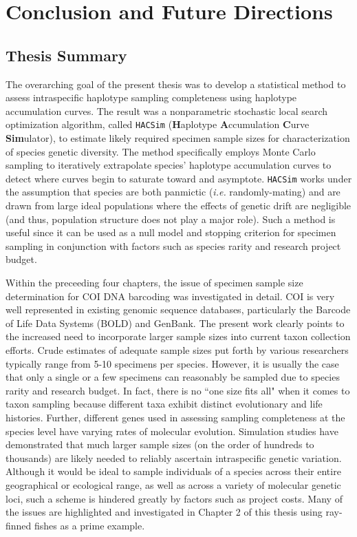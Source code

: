 \linespread{1.0}

\chapter{Conclusion and Future Directions}
\section{Thesis Summary} \label{sec:intro1}

The overarching goal of the present thesis was to develop a statistical method to assess intraspecific haplotype sampling completeness using haplotype accumulation curves. The result was a nonparametric stochastic local search optimization algorithm, called {\tt HACSim} (\textbf{H}aplotype \textbf{A}ccumulation \textbf{C}urve \textbf{Sim}ulator), to estimate likely required specimen sample sizes for characterization of species genetic diversity. The method specifically employs Monte Carlo sampling to iteratively extrapolate species' haplotype accumulation curves to detect where curves begin to saturate toward and asymptote. {\tt HACSim} works under the assumption that species are both panmictic (\textit{i.e.} randomly-mating) and are drawn from large ideal populations where the effects of genetic drift are negligible (and thus, population structure does not play a major role). Such a method is useful since it can be used as a null model and stopping criterion for specimen sampling in conjunction with factors such as species rarity and research project budget.

Within the preceeding four chapters, the issue of specimen sample size determination for COI DNA barcoding was investigated in detail. COI is very well represented in existing genomic sequence databases, particularly the Barcode of Life Data Systems (BOLD) and GenBank. The present work clearly points to the increased need to incorporate larger sample sizes into current taxon collection efforts. Crude estimates of adequate sample sizes put forth by various researchers typically range from 5-10 specimens per species. However, it is usually the case that only a single or a few specimens can reasonably be sampled due to species rarity and research budget. In fact, there is no ``one size fits all" when it comes to taxon sampling because different taxa exhibit distinct evolutionary and life histories. Further, different genes used in assessing sampling completeness at the species level have varying rates of molecular evolution. Simulation studies have demonstrated that much larger sample sizes (on the order of hundreds to thousands) are likely needed to reliably ascertain intraspecific genetic variation. Although it would be ideal to sample individuals of a species across their entire geographical or ecological range, as well as across a variety of molecular genetic loci, such a scheme is hindered greatly by factors such as project costs. Many of the issues are highlighted and investigated in Chapter 2 of this thesis using ray-finned fishes as a prime example.

